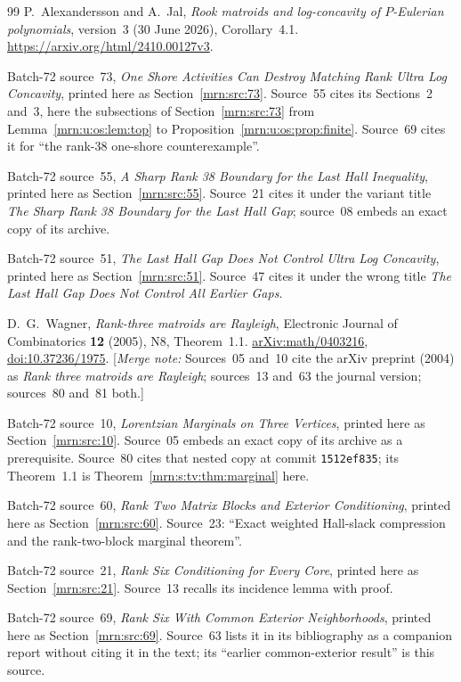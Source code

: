 \documentclass[11pt,a4paper]{article}
\theoremstyle{remark}\newtheorem{remark}[theorem]{Remark}
\newcommand{\mnote}[1]{[\textit{Merge note:} #1]}
\begin{document}
\begin{thebibliography}{99}
P.~Alexandersson and A.~Jal, \emph{Rook matroids and log-concavity of
$P$-Eulerian polynomials}, version~3 (30 June 2026), Corollary~4.1.
\url{https://arxiv.org/html/2410.00127v3}.

Batch-72 source~73, \emph{One Shore Activities Can Destroy Matching Rank
Ultra Log Concavity}, printed here as Section~\ref{mrn:src:73}. Source~55
cites its Sections~2 and~3, here the subsections of
Section~\ref{mrn:src:73} from Lemma~\ref{mrn:u:os:lem:top} to
Proposition~\ref{mrn:u:os:prop:finite}.
Source~69 cites it for ``the rank-38 one-shore counterexample''.

Batch-72 source~55, \emph{A Sharp Rank 38 Boundary for the Last Hall
Inequality}, printed here as Section~\ref{mrn:src:55}.
Source~21 cites it under the variant title \emph{The Sharp Rank 38 Boundary
for the Last Hall Gap}; source~08 embeds an exact copy of its archive.

Batch-72 source~51, \emph{The Last Hall Gap Does Not Control Ultra Log
Concavity}, printed here as Section~\ref{mrn:src:51}. Source~47 cites it under
the wrong title \emph{The Last Hall Gap Does Not Control All Earlier Gaps}.

D.~G.~Wagner, \emph{Rank-three matroids are Rayleigh}, Electronic Journal of
Combinatorics \textbf{12} (2005), N8, Theorem~1.1.
\href{https://arxiv.org/abs/math/0403216}{arXiv:math/0403216},
\href{https://doi.org/10.37236/1975}{doi:10.37236/1975}.
\mnote{Sources~05 and~10 cite the arXiv preprint (2004) as \emph{Rank three
matroids are Rayleigh}; sources~13 and~63 the journal version; sources~80
and~81 both.}

Batch-72 source~10, \emph{Lorentzian Marginals on Three Vertices}, printed
here as Section~\ref{mrn:src:10}. Source~05 embeds an exact copy of its
archive as a prerequisite. Source~80 cites that nested copy at commit
\texttt{1512ef835}; its Theorem~1.1 is Theorem~\ref{mrn:s:tv:thm:marginal}
here.

Batch-72 source~60, \emph{Rank Two Matrix Blocks and Exterior Conditioning},
printed here as Section~\ref{mrn:src:60}. Source~23: ``Exact weighted
Hall-slack compression and the rank-two-block marginal theorem''.

Batch-72 source~21, \emph{Rank Six Conditioning for Every Core},
printed here as Section~\ref{mrn:src:21}.
Source~13 recalls its incidence lemma with proof.

Batch-72 source~69, \emph{Rank Six With Common Exterior Neighborhoods},
printed here as Section~\ref{mrn:src:69}. Source~63 lists it in its
bibliography as a companion report without citing it in the text; its
``earlier common-exterior result'' is this source.


\end{thebibliography}
\end{document}
